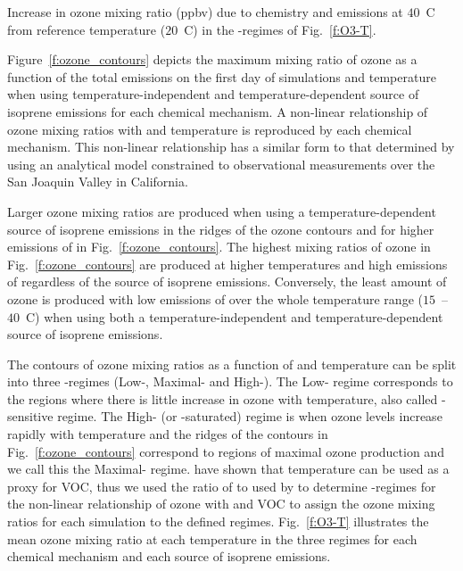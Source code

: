 \begin{table}%
    \centering%
    \caption{Increase in ozone mixing ratio (ppbv) due to chemistry and emissions at $40$~\degree C from reference temperature ($20$~\degree C) in the -regimes of Fig.~\ref{f:O3-T}.}%
    \label{t:differences}%
\end{table}

Figure~\ref{f:ozone_contours} depicts the maximum mixing ratio of ozone as a function of the total  emissions on the first day of simulations and temperature when using temperature-independent and temperature-dependent source of isoprene emissions for each chemical mechanism.
A non-linear relationship of ozone mixing ratios with  and temperature is reproduced by each chemical mechanism.
This non-linear relationship has a similar form to that determined by \citet{Pusede:2014} using an analytical model constrained to observational measurements over the San Joaquin Valley in California.

Larger ozone mixing ratios are produced when using a temperature-dependent source of isoprene emissions in the ridges of the ozone contours and for higher emissions of  in Fig.~\ref{f:ozone_contours}.
The highest mixing ratios of ozone in Fig.~\ref{f:ozone_contours} are produced at higher temperatures and high emissions of  regardless of the source of isoprene emissions.
Conversely, the least amount of ozone is produced with low emissions of  over the whole temperature range ($15$~--~$40$~\degree C) when using both a temperature-independent and temperature-dependent source of isoprene emissions.

The contours of ozone mixing ratios as a function of  and temperature can be split into three -regimes (Low-, Maximal- and High-).
The Low- regime corresponds to the regions where there is little increase in ozone with temperature, also called -sensitive regime.
The High- (or -saturated) regime is when ozone levels increase rapidly with temperature and the ridges of the contours in Fig.~\ref{f:ozone_contours} correspond to regions of maximal ozone production and we call this the Maximal- regime.
\citet{Pusede:2014} have shown that temperature can be used as a proxy for VOC, thus we used the ratio of  to  used by \citet{Sillman:1995} to determine -regimes for the non-linear relationship of ozone with  and VOC to assign the ozone mixing ratios for each simulation to the defined  regimes.
Fig.~\ref{f:O3-T} illustrates the mean ozone mixing ratio at each temperature in the three  regimes for each chemical mechanism and each source of isoprene emissions.

